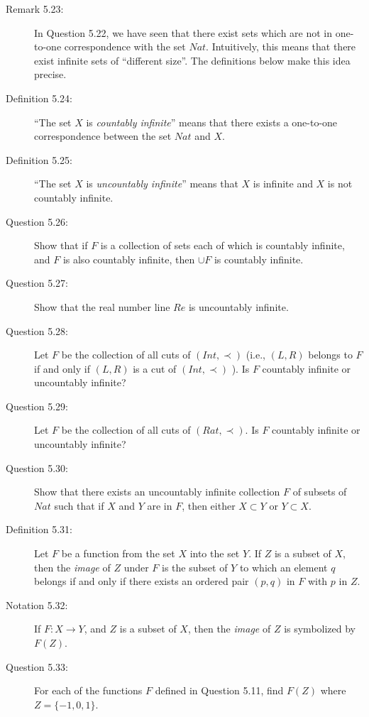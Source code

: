 \documentclass{book}
\begin{document}
\begin{description}
\item[Remark 5.23:] In Question 5.22, we have seen that there exist sets which are not in one-to-one correspondence with the set $Nat$. Intuitively, this means that there exist infinite sets of ``different size''. The definitions below make this idea precise.

\item[Definition 5.24:] ``The set $X$ is \emph{countably infinite}'' means that there exists a one-to-one correspondence between the set $Nat$ and $X$.

\item[Definition 5.25:] ``The set $X$ is \emph{uncountably infinite}'' means that $X$ is infinite and $X$ is not countably infinite.

\item[Question 5.26:] Show that if $F$ is a collection of sets each of which is countably infinite, and $F$ is also countably infinite, then $\cup F$ is countably infinite.

\item[Question 5.27:] Show that the real number line $Re$ is uncountably infinite.

\item[Question 5.28:] Let $F$ be the collection of all cuts of $(Int, \prec)$ (i.e., $(L,R)$ belongs to $F$ if and only if $(L,R)$ is a cut of $(Int, \prec)$ ). Is $F$ countably infinite or uncountably infinite?

\item[Question 5.29:] Let $F$ be the collection of all cuts of $(Rat, \prec)$. Is $F$ countably infinite or uncountably infinite?

\item[Question 5.30:] Show that there exists an uncountably infinite collection $F$ of subsets of $Nat$ such that if $X$ and $Y$ are in $F$, then either $X \subset Y$ or $Y \subset X$.

\item[Definition 5.31:] Let $F$ be a function from the set $X$ into the set $Y$. If $Z$ is a subset of $X$, then the \emph{image} of $Z$ under $F$ is the subset of $Y$ to which an element $q$ belongs if and only if there exists an ordered pair $(p,q)$ in $F$ with $p$ in $Z$.

\item[Notation 5.32:] If $F: X \rightarrow Y$, and $Z$ is a subset of $X$, then the \emph{image} of $Z$ is symbolized by $F(Z)$.

\item[Question 5.33:] For each of the functions $F$ defined in Question 5.11, find $F(Z)$ where $Z = \{ -1, 0, 1 \}$.


\end{description}
\end{document}
